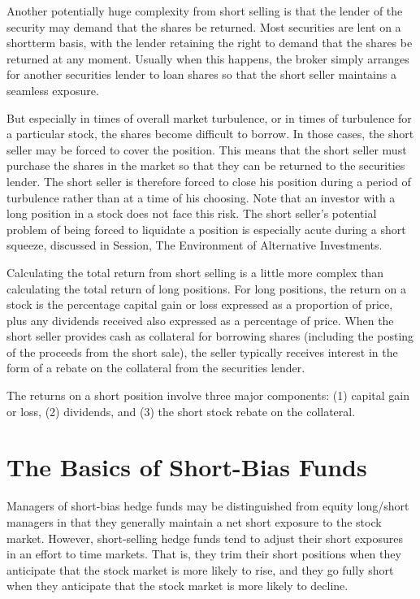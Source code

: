 \documentclass[11pt]{article}
\begin{document}
Another potentially huge complexity from short selling is that the lender of the security may demand that the shares be returned. Most securities are lent on a shortterm basis, with the lender retaining the right to demand that the shares be returned at any moment. Usually when this happens, the broker simply arranges for another securities lender to loan shares so that the short seller maintains a seamless exposure.

But especially in times of overall market turbulence, or in times of turbulence for a particular stock, the shares become difficult to borrow. In those cases, the short seller may be forced to cover the position. This means that the short seller must purchase the shares in the market so that they can be returned to the securities lender. The short seller is therefore forced to close his position during a period of turbulence rather than at a time of his choosing. Note that an investor with a long position in a stock does not face this risk. The short seller's potential problem of being forced to liquidate a position is especially acute during a short squeeze, discussed in Session, The Environment of Alternative Investments.

Calculating the total return from short selling is a little more complex than calculating the total return of long positions. For long positions, the return on a stock is the percentage capital gain or loss expressed as a proportion of price, plus any dividends received also expressed as a percentage of price. When the short seller provides cash as collateral for borrowing shares (including the posting of the proceeds from the short sale), the seller typically receives interest in the form of a rebate on the collateral from the securities lender.

The returns on a short position involve three major components: (1) capital gain or loss, (2) dividends, and (3) the short stock rebate on the collateral.

\section*{The Basics of Short-Bias Funds}
Managers of short-bias hedge funds may be distinguished from equity long/short managers in that they generally maintain a net short exposure to the stock market. However, short-selling hedge funds tend to adjust their short exposures in an effort to time markets. That is, they trim their short positions when they anticipate that the stock market is more likely to rise, and they go fully short when they anticipate that the stock market is more likely to decline.
\end{document}
